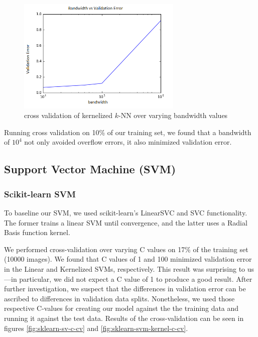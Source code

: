 \documentclass{article} %
\begin{document}
\begin{figure}[h]
\centering
\includegraphics[width=0.7\textwidth]{knn-kernel-bandwidth-cv.png}
\caption{cross validation of kernelized $k$-NN over varying bandwidth values}
\label{fig:knn-kernel-bandwidth-cv}
\end{figure}

Running cross validation on 10\% of our training set, we found that a
bandwidth of $10^4$ not only avoided overflow errors, it also minimized validation error.

\subsection{Support Vector Machine (SVM)}
\subsubsection{Scikit-learn SVM}
To baseline our SVM,
we used scikit-learn's LinearSVC and SVC functionality. The
former trains a linear SVM until convergence, and the latter uses a Radial Basis function kernel. 

We performed cross-validation over varying C values on 17\% of
the training set (10000 images). We found that C values of 1 and 100
minimized validation error in the Linear and Kernelized SVMs, respectively.
This result was surprising to us---in particular, we did not expect a C value of
1 to produce a good result. After further investigation, we
suspect that the differences in
validation error can be ascribed to differences in validation data splits.
Nonetheless, we
used those respective C-values for creating our model against the
the training data and running it against the test data. Results of the
cross-validation can be seen in figures \ref{fig:sklearn-sv-c-cv} and \ref{fig:sklearn-svm-kernel-c-cv}.
\end{document}
